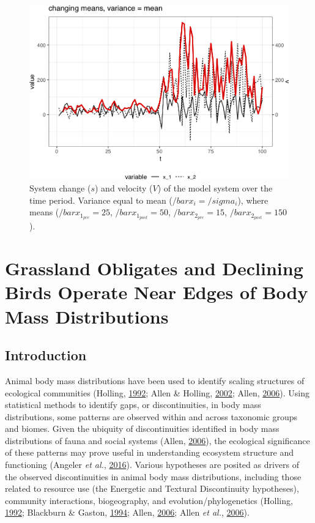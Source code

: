 \documentclass[print]{nuthesis}
\begin{document}
\newpage
\begin{figure}
\includegraphics[width=0.85\linewidth]{./chapterFiles/velocity/figsCalledInDiss/velocSysEx4} \caption{System change ($s$) and velocity ($V$) of the model system over the time period. Variance equal to mean ($/bar{x_i}=/sigma_i$), where means ($/bar{x}_{1_{pre}}=25$, $/bar{x}_{1_{post}}=50$, $/bar{x}_{2_{pre}}=15$, $/bar{x}_{2_{post}}=150$).}\label{fig:velocSysEx4}
\end{figure}
\hypertarget{discontinuity}{%
\chapter{Grassland Obligates and Declining Birds Operate Near Edges of Body Mass Distributions}\label{discontinuity}}

\hypertarget{introduction-5}{%
\section{Introduction}\label{introduction-5}}

Animal body mass distributions have been used to identify scaling structures of ecological communities (Holling, \protect\hyperlink{ref-holling1992cross}{1992}; Allen \& Holling, \protect\hyperlink{ref-allen2002cross}{2002}; Allen, \protect\hyperlink{ref-allen2006discontinuities}{2006}). Using statistical methods to identify gaps, or discontinuities, in body mass distributions, some patterns are observed within and across taxonomic groups and biomes. Given the ubiquity of discontinuities identified in body mass distributions of fauna and social systems (Allen, \protect\hyperlink{ref-allen2006discontinuities}{2006}), the ecological significance of these patterns may prove useful in understanding ecosystem structure and functioning (Angeler \emph{et al.}, \protect\hyperlink{ref-angeler2016management}{2016}). Various hypotheses are posited as drivers of the observed discontinuities in animal body mass distributions, including those related to resource use (the Energetic and Textural Discontinuity hypotheses), community interactions, biogeography, and evolution/phylogenetics (Holling, \protect\hyperlink{ref-holling1992cross}{1992}; Blackburn \& Gaston, \protect\hyperlink{ref-blackburn1994animal}{1994}; Allen, \protect\hyperlink{ref-allen2006discontinuities}{2006}; Allen \emph{et al.}, \protect\hyperlink{ref-allen2006patterns}{2006}).
\end{document}
